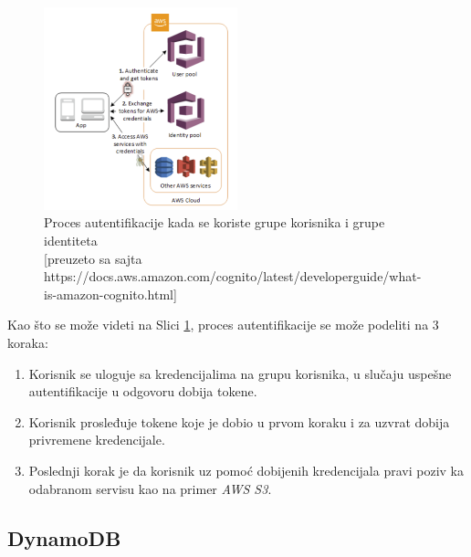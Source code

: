 \documentclass[12pt,oneside]{memoir}
\begin{document}

\begin{figure}[!ht]
  \centering
  \includegraphics[width=0.5\textwidth]{ProcesAutentifikacije.png}
  \caption{Proces autentifikacije kada se koriste grupe korisnika i grupe identiteta\\\footnotesize[preuzeto sa sajta https://docs.aws.amazon.com/cognito/latest/developerguide/what-is-amazon-cognito.html]}
  \label{fig:procesAutentifikacije}
\end{figure}

Kao što se može videti na Slici \ref{fig:procesAutentifikacije}, proces autentifikacije se može podeliti na 3 koraka:
\begin{enumerate}
  \item Korisnik se uloguje sa kredencijalima na grupu korisnika, u slučaju uspešne autentifikacije u odgovoru dobija tokene.
  \item Korisnik prosleđuje tokene koje je dobio u prvom koraku i za uzvrat dobija privremene kredencijale.
  \item Poslednji korak je da korisnik uz pomoć dobijenih kredencijala pravi poziv ka odabranom servisu kao na primer \emph{AWS S3}.
\end{enumerate}

\subsection{DynamoDB}
\end{document}
